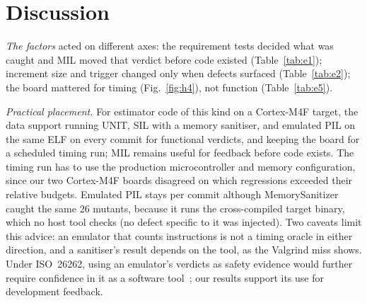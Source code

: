 \documentclass[conference]{IEEEtran}
\begin{document}
\section{Discussion}

\emph{The factors} acted on different axes: the requirement tests decided what was caught and MIL moved that
verdict before code existed (Table~\ref{tab:e1}); increment size and trigger changed only when
defects surfaced (Table~\ref{tab:e2}); the board mattered for timing (Fig.~\ref{fig:h4}), not function (Table~\ref{tab:e5}).

\emph{Practical placement.} For estimator code of this kind on a Cortex-M4F target, the data support running
UNIT, SIL with a memory sanitiser, and emulated PIL on the same ELF on every commit for functional verdicts,
and keeping the board for a scheduled timing run; MIL remains useful for feedback before code exists. The
timing run has to use the production microcontroller and
memory configuration, since our two Cortex-M4F boards disagreed on which regressions exceeded their
relative budgets. Emulated PIL stays per commit although MemorySanitizer caught the same 26 mutants, because
it runs the cross-compiled target binary, which no host tool checks (no defect specific to it was injected). Two caveats limit this advice: an emulator that counts
instructions is not a timing oracle in either direction, and a sanitiser's result depends on the tool, as the
Valgrind miss shows. Under ISO~26262, using an emulator's verdicts as safety evidence would further require
confidence in it as a software tool~\cite{iso26262p8}; our results support its use for development feedback.
\end{document}
